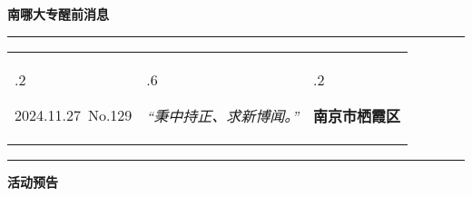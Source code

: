 \documentclass[letterpaper, 12pt]{article}
\begin{document}
\begin{center}
    \Huge\textbf{南哪大专醒前消息}
\end{center}
\vspace{4mm}
\hrule
\renewcommand\tabularxcolumn[1]{m{#1}}
\begin{tabularx}{\textwidth}{>{\hsize.2\hsize}X>{\hsize.6\hsize}X>{\hsize.2\hsize}X}
    \begin{flushleft}
        2024.11.27\, No.129
    \end{flushleft}
    &
    \begin{center}
        \textit{“秉中持正、求新博闻。”}
    \end{center}
    &
    \begin{flushright}
        \textbf{南京市栖霞区}
    \end{flushright}
\end{tabularx}
\vspace{-3.5mm}
\hrule
\vspace{4mm}
\centerline{\huge\textbf{活动预告}}
\end{document}
